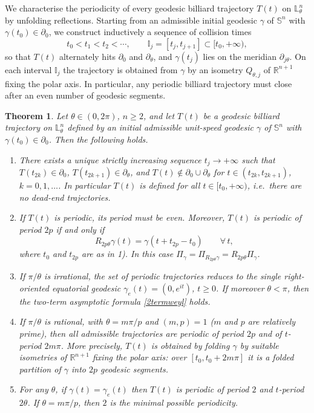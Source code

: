\documentclass[11pt,a4paper,times]{amsart}
\theoremstyle{plain}
\newtheorem{thm}{Theorem}[section]
\theoremstyle{definition}
\numberwithin{equation}{section}
\newcommand{\R}{\mathbb{R}}
\newcommand{\Se}{\mathbb{S}}
\newcommand{\lune}[2]{\mathbb{L}^{#1}_{#2}}
\begin{document}
We characterise the periodicity of every geodesic billiard trajectory $T(t)$ on $\lune{n}{\theta}$
by unfolding reflections. Starting from an admissible initial geodesic $\gamma$ of $\Se^n$ with
$\gamma(t_0)\in\partial_0$, we construct inductively a sequence of collision times
\[
t_0<t_1<t_2<\cdots,\qquad \mathbb{I}_j=[t_j,t_{j+1}]\subset [t_0,+\infty),
\]
so that $T(t)$ alternately hits $\partial_0$ and $\partial_\theta$, and $\gamma(t_j)$ lies on the meridian
$\partial_{j\theta}$. On each interval $\mathbb{I}_j$ the trajectory is obtained from $\gamma$ by an isometry
$Q_{\theta,j}$ of $\R^{n+1}$ fixing the polar axis. In particular, any periodic billiard trajectory must
close after an even number of geodesic segments.

%
\begin{thm}\label{thmA}
Let $\theta\in (0,2\pi)$, $n\ge 2$, and let $T(t)$ be a geodesic billiard trajectory on $\lune{n}{\theta}$
defined by an initial admissible unit-speed geodesic $\gamma$ of $\Se^n$ with $\gamma(t_0)\in \partial_0$.
Then the following holds.
\begin{enumerate}[{\rm 1)}]
\item There exists a unique strictly increasing sequence $t_j\to +\infty$ such that
$T(t_{2k})\in \partial_0$, $T(t_{2k+1})\in\partial_{\theta}$, and
$T(t)\notin \partial_0\cup\partial_\theta$ for $t\in (t_{2k},t_{2k+1})$, $k=0,1,\ldots$.
In particular $T(t)$ is defined for all $t\in [t_0,+\infty)$, i.e.\ there are no dead-end trajectories.\\[-3mm]

\item If $T(t)$ is periodic, its period must be even. Moreover, $T(t)$ is periodic of period $2p$
if and only if
\[
R_{2p\theta}\gamma(t)=\gamma(t+t_{2p}-t_0)\qquad\forall\,t,
\]
where $t_0$ and $t_{2p}$ are as in {\rm 1)}. In this case
$\Pi_{\gamma}=\Pi_{R_{2p\theta}\gamma}=R_{2p\theta}\Pi_{\gamma}$.\\[-3mm]

\item[{\rm 3a)}] If $\pi/\theta$ is irrational, the set of periodic trajectories reduces to the single
right-oriented equatorial geodesic $\gamma_e(t)=(0,e^{it})$, $t\ge 0$.
If moreover $\theta<\pi$, then the two-term asymptotic formula \eqref{2termweyl} holds.\\[-3mm]

\item[{\rm 3b)}] If $\pi/\theta$ is rational, with $\theta=m\pi/p$ and $(m,p)=1$ ($m$ and $p$ are relatively prime), then all admissible
trajectories are periodic of period $2p$ and of $t$-period $2m\pi$.
More precisely, $T(t)$ is obtained by folding $\gamma$ by suitable isometries of $\R^{n+1}$ fixing the
polar axis: over $[t_0,t_0+2m\pi]$ it is a folded partition of $\gamma$ into $2p$ geodesic segments.\\[-3mm]

\item[{\rm 3c)}] For any $\theta$, if $\gamma(t)=\gamma_e(t)$ then $T(t)$ is periodic of period $2$ and $t$-period  $2\theta$. If $\theta=m\pi/p$, then $2$ is the minimal possible
periodicity.
\end{enumerate}
\end{thm}
\end{document}
